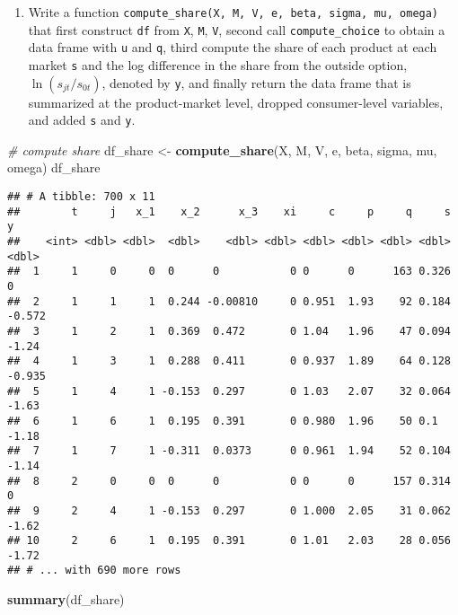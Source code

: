\documentclass[
]{book}
\newenvironment{Shaded}{\begin{snugshade}}{\end{snugshade}}
\newcommand{\CommentTok}[1]{\textcolor[rgb]{0.56,0.35,0.01}{\textit{#1}}}
\newcommand{\KeywordTok}[1]{\textcolor[rgb]{0.13,0.29,0.53}{\textbf{#1}}}
\newcommand{\NormalTok}[1]{#1}
\newcommand{\StringTok}[1]{\textcolor[rgb]{0.31,0.60,0.02}{#1}}
\providecommand{\tightlist}{%
  \setlength{\itemsep}{0pt}\setlength{\parskip}{0pt}}
\begin{document}
\begin{enumerate}
\def\labelenumi{\arabic{enumi}.}
\setcounter{enumi}{8}
\tightlist
\item
  Write a function \texttt{compute\_share(X,\ M,\ V,\ e,\ beta,\ sigma,\ mu,\ omega)} that first construct \texttt{df} from \texttt{X}, \texttt{M}, \texttt{V}, second call \texttt{compute\_choice} to obtain a data frame with \texttt{u} and \texttt{q}, third compute the share of each product at each market \texttt{s} and the log difference in the share from the outside option, \(\ln(s_{jt}/s_{0t})\), denoted by \texttt{y}, and finally return the data frame that is summarized at the product-market level, dropped consumer-level variables, and added \texttt{s} and \texttt{y}.
\end{enumerate}

\begin{Shaded}
\begin{Highlighting}[]
\CommentTok{# compute share}
\NormalTok{df_share <-}
\StringTok{  }\KeywordTok{compute_share}\NormalTok{(X, M, V, e, beta, sigma, }
\NormalTok{                mu, omega)}
\NormalTok{df_share}
\end{Highlighting}
\end{Shaded}

\begin{verbatim}
## # A tibble: 700 x 11
##        t     j   x_1    x_2      x_3    xi     c     p     q     s      y
##    <int> <dbl> <dbl>  <dbl>    <dbl> <dbl> <dbl> <dbl> <dbl> <dbl>  <dbl>
##  1     1     0     0  0      0           0 0      0      163 0.326  0    
##  2     1     1     1  0.244 -0.00810     0 0.951  1.93    92 0.184 -0.572
##  3     1     2     1  0.369  0.472       0 1.04   1.96    47 0.094 -1.24 
##  4     1     3     1  0.288  0.411       0 0.937  1.89    64 0.128 -0.935
##  5     1     4     1 -0.153  0.297       0 1.03   2.07    32 0.064 -1.63 
##  6     1     6     1  0.195  0.391       0 0.980  1.96    50 0.1   -1.18 
##  7     1     7     1 -0.311  0.0373      0 0.961  1.94    52 0.104 -1.14 
##  8     2     0     0  0      0           0 0      0      157 0.314  0    
##  9     2     4     1 -0.153  0.297       0 1.000  2.05    31 0.062 -1.62 
## 10     2     6     1  0.195  0.391       0 1.01   2.03    28 0.056 -1.72 
## # ... with 690 more rows
\end{verbatim}

\begin{Shaded}
\begin{Highlighting}[]
\KeywordTok{summary}\NormalTok{(df_share)}
\end{Highlighting}
\end{Shaded}
\end{document}
